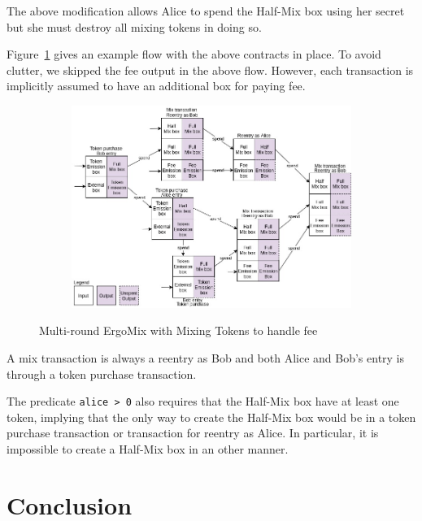 \documentclass[runningheads]{llncs}
\newcommand{\mixname}{ErgoMix\xspace}
\begin{document}
The above modification allows Alice to spend the Half-Mix box using her secret but she must destroy all mixing tokens in doing so. 

Figure~\ref{fig:mixingtokens} gives an example flow with the above contracts in place. To avoid clutter, we skipped the fee output in the above flow. However, each transaction is implicitly assumed to have an additional box for paying fee.

\begin{figure}[h]
	\centering
	\begin{subfigure}{0.9\textwidth}
		\centering
		\includegraphics[width=\linewidth]{MixingTokens.jpg}
	\end{subfigure}
	\caption{Multi-round \mixname with Mixing Tokens to handle fee}
\label{fig:mixingtokens}
\end{figure}

A mix transaction is always a reentry as Bob and both Alice and Bob's entry is through a token purchase transaction. 

The predicate \texttt{alice > 0} also requires that the Half-Mix box have at least one token, implying that the only way to create the Half-Mix box would be in a token purchase transaction or transaction for reentry as Alice. In particular, it is impossible to create a Half-Mix box in an other manner.

\section{Conclusion}
\end{document}
